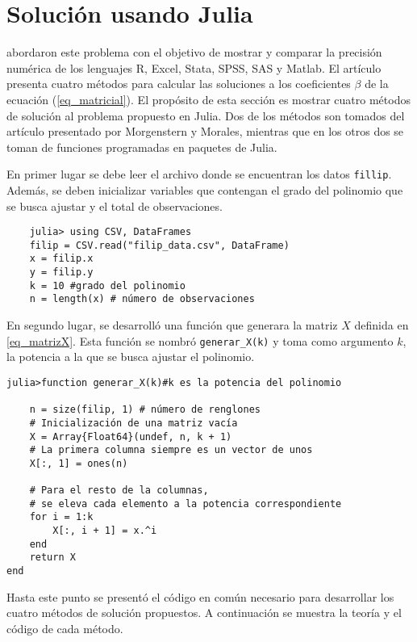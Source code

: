 \section{Solución usando Julia}

\cite{laberintos} abordaron este problema con el objetivo de mostrar y comparar la precisión numérica de los lenguajes \textsf{R, Excel, Stata, SPSS, SAS} y \textsf{Matlab}. El artículo presenta cuatro métodos para calcular las soluciones a los coeficientes $\beta$ de la ecuación (\ref{eq_matricial}). El propósito de esta sección es mostrar cuatro métodos de solución al problema propuesto en \textsf{Julia}. Dos de los métodos son tomados del artículo presentado por Morgenstern y Morales, mientras que en los otros dos se toman de funciones programadas en paquetes de \textsf{Julia}. 

En primer lugar se debe leer el archivo donde se encuentran los datos \texttt{fillip}. Además, se deben inicializar variables que contengan el grado del polinomio que se busca ajustar y el total de observaciones. 

\begin{verbatim}
    julia> using CSV, DataFrames
    filip = CSV.read("filip_data.csv", DataFrame)
    x = filip.x
    y = filip.y
    k = 10 #grado del polinomio
    n = length(x) # número de observaciones
\end{verbatim}

En segundo lugar, se desarrolló una función que generara la matriz $X$ definida en \ref{eq_matrizX}. Esta función se nombró \texttt{generar\_X(k)} y toma como argumento $k$, la potencia a la que se busca ajustar el polinomio. 


\begin{verbatim}
julia>function generar_X(k)#k es la potencia del polinomio

    n = size(filip, 1) # número de renglones
    # Inicialización de una matriz vacía
    X = Array{Float64}(undef, n, k + 1)
    # La primera columna siempre es un vector de unos
    X[:, 1] = ones(n)
    
    # Para el resto de la columnas,
    # se eleva cada elemento a la potencia correspondiente
    for i = 1:k
        X[:, i + 1] = x.^i
    end
    return X
end
\end{verbatim}

Hasta este punto se presentó el código en común necesario para desarrollar los cuatro métodos de solución propuestos. A continuación se muestra la teoría y el código de cada método. 

